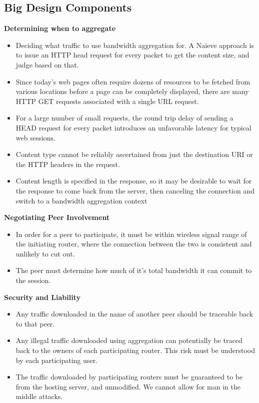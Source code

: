 \documentclass[12pt]{article}
\begin{document}
	\subsection{Big Design Components}
		{\bf Determining when to aggregate}
		\begin{itemize}
			\item Deciding what traffic to use bandwidth aggregation for. A Naieve approach is to issue an HTTP head request for every packet to get the content size, and judge based on that. 
			\item Since today's web pages often require dozens of resources to be fetched from various locations before a page can be completely displayed, there are many HTTP GET requests associated with a single URL request.
			\item For a large number of small requests, the round trip delay of sending a HEAD request for every packet introduces an unfavorable latency for typical web sessions.
			\item Content type cannot be reliably ascertained from just the destination URI or the HTTP headers in the request. 
			\item Content length is specified in the response, so it may be desirable to wait for the response to come back from the server, then canceling the connection and switch to a bandwidth aggregation context
		\end{itemize}
		{\bf Negotiating Peer Involvement}
		\begin{itemize}
			\item In order for a peer to participate, it must be within wireless signal range of the initiating router, where the connection between the two is consistent and unlikely to cut out.
			\item The peer must determine how much of it's total bandwidth it can commit to the session.
		\end{itemize}
		{\bf Security and Liability}
		\begin{itemize}
			\item Any traffic downloaded in the name of another peer should be traceable back to that peer.
			\item Any illegal traffic downloaded using aggregation can potentially be traced back to the owners of each participating router. This risk must be understood by each participating user.
			\item The traffic downloaded by participating routers must be guaranteed to be from the hosting server, and unmodified. We cannot allow for man in the middle attacks.
		\end{itemize}
\end{document}
